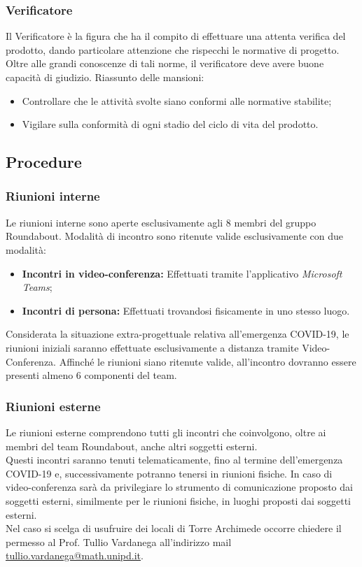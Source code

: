 	\subsubsection{Verificatore}
	Il Verificatore è la figura che ha il compito di effettuare una attenta verifica del prodotto, dando particolare attenzione che rispecchi le normative di progetto. Oltre alle grandi conoscenze di tali norme, il verificatore deve avere buone capacità di giudizio.
	Riassunto delle mansioni:
	\begin{itemize}
		\item Controllare che le attività svolte siano conformi alle normative stabilite;
		\item Vigilare sulla conformità di ogni stadio del ciclo di vita del prodotto.
	\end{itemize}


\subsection{Procedure}
	\subsubsection{Riunioni interne}
		Le riunioni interne sono aperte esclusivamente agli 8 membri del gruppo Roundabout. Modalità di incontro sono ritenute valide esclusivamente con due modalità:
		\begin{itemize}
			\item \textbf{Incontri in video-conferenza:} Effettuati tramite l'applicativo \textit{Microsoft Teams};
			\item \textbf{Incontri di persona:} Effettuati trovandosi fisicamente in uno stesso luogo.
		\end{itemize}
		Considerata la situazione extra-progettuale relativa all'emergenza COVID-19, le riunioni iniziali saranno effettuate esclusivamente a distanza tramite Video-Conferenza.
		Affinché le riunioni siano ritenute valide, all'incontro dovranno essere presenti almeno 6 componenti del team.
	
	\subsubsection{Riunioni esterne}
		Le riunioni esterne comprendono tutti gli incontri che coinvolgono, oltre ai membri del team Roundabout, anche altri soggetti esterni.\\
		Questi incontri saranno tenuti telematicamente, fino al termine dell'emergenza COVID-19 e, successivamente potranno tenersi in riunioni fisiche. In caso di video-conferenza sarà da privilegiare lo strumento di comunicazione proposto dai soggetti esterni, similmente per le riunioni fisiche, in luoghi proposti dai soggetti esterni.\\
		Nel caso si scelga di usufruire dei locali di Torre Archimede occorre chiedere il permesso al Prof. Tullio Vardanega all'indirizzo mail \href{mailto:tullio.vardanega@math.unipd.it}{tullio.vardanega@math.unipd.it}.
	
